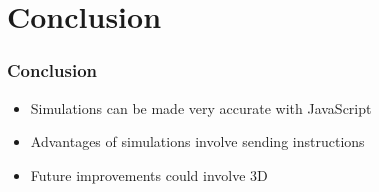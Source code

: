 \documentclass{beamer}
\begin{document}
\section{Conclusion}

\begin{frame}
\frametitle{Conclusion}

\begin{itemize}

\item Simulations can be made very accurate with JavaScript

\item Advantages of simulations involve sending instructions

\item Future improvements could involve 3D

\end{itemize}

\end{frame}



















































\end{document}
